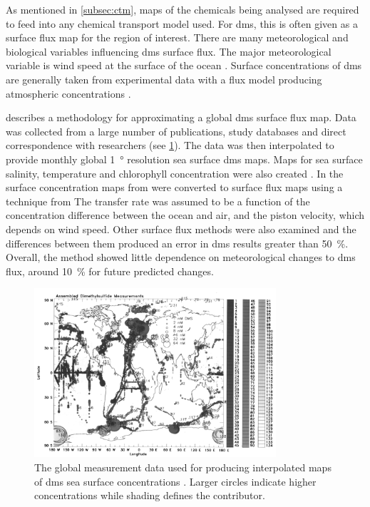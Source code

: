 	As mentioned in \cref{subsec:ctm}, maps of the chemicals being analysed are required to feed into any chemical transport model used. For \gls{dms}, this is often given as a surface flux map for the region of interest. There are many meteorological and biological variables influencing \gls{dms} surface flux. The major meteorological variable is wind speed at the surface of the ocean \citep{Kettle:2000jy}. Surface concentrations of \gls{dms} are generally taken from experimental data with a flux model producing atmospheric concentrations \citep{woodhouse:2010ed}.

	\citet{Kettle:2000jy} describes a methodology for approximating a global \gls{dms} surface flux map. Data was collected from a large number of publications, study databases and direct correspondence with researchers (see \cref{fig:kettledata}). The data was then interpolated to provide monthly global \SI{1}{\degree} resolution sea surface \gls{dms} maps. Maps for sea surface salinity, temperature and chlorophyll concentration were also created \citep{kettle1999global}. In \citet{Kettle:2000jy} the surface concentration maps from \citet{kettle1999global} were converted to surface flux maps using a technique from \citet{liss:1983iu} The transfer rate was assumed to be a function of the concentration difference between the ocean and air, and the piston velocity, which depends on wind speed. Other surface flux methods were also examined and the differences between them produced an error in \gls{dms} results greater than \SI{50}{\percent}. Overall, the method showed little dependence on meteorological changes to \gls{dms} flux, around \SI{10}{\percent} for future predicted changes.

	\begin{figure}[!htb]
	    \centering
	    \includegraphics[width=0.8\textwidth,natwidth=1414,natheight=1344]{Fig/Literature_Review/kettledata.png}
	    \caption{The global measurement data used for producing interpolated maps of \gls{dms} sea surface concentrations \citep{kettle1999global}. Larger circles indicate higher concentrations while shading defines the contributor.}
	    \label{fig:kettledata}
	\end{figure}

